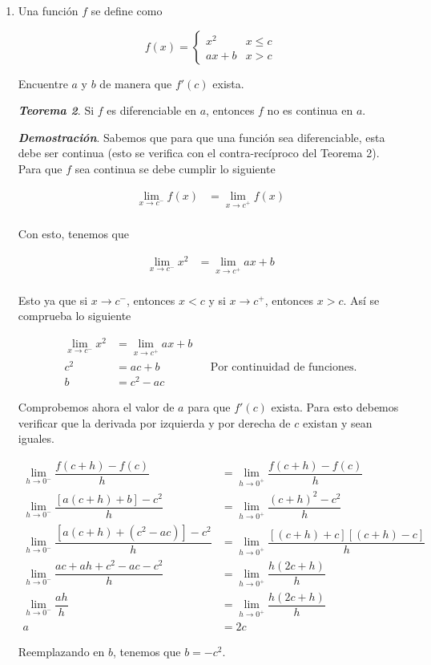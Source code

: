 \documentclass{report}
\begin{document}
\begin{enumerate}
        \item Una función $f$ se define como

        $$
            f(x) = \begin{cases}
                x^2 & x\leq c\\
                ax + b & x > c
            \end{cases}
        $$

        Encuentre $a$ y $b$ de manera que $f'(c)$ exista.

        \textit{\textbf{Teorema 2}}. Si $f$ es diferenciable en $a$, entonces $f$ no es continua en $a$.

        \textit{\textbf{Demostración}}. Sabemos que para que una función sea diferenciable, esta debe ser continua (esto se verifica con el contra-recíproco del Teorema 2). Para que $f$ sea continua se debe cumplir lo siguiente

        \begin{align*}
            \lim_{x\to c^-}f(x) &= \lim_{x\to c^+}f(x) \\
        \end{align*}

        Con esto, tenemos que

        \begin{align*}
            \lim_{x\to c^-}x^2 &= \lim_{x\to c^+}ax+b \\
        \end{align*}

        Esto ya que si $x \to c^-$, entonces $x < c$ y si $x \to c^+$, entonces $x > c$. Así se comprueba lo siguiente

        \begin{align*}
            \lim_{x\to c^-}x^2 &= \lim_{x\to c^+}ax+b \\
            c^2 &= ac+b && \text{Por continuidad de funciones.}\\
            b &= c^2 - ac
        \end{align*}

        Comprobemos ahora el valor de $a$ para que $f'(c)$ exista. Para esto debemos verificar que la derivada por izquierda y por derecha de $c$ existan y sean iguales.

        \begin{align*}
            \lim_{h \to 0^-} \dfrac{f(c+h)-f(c)}{h} &= \lim_{h \to 0^+} \dfrac{f(c+h)-f(c)}{h} \\
            \lim_{h \to 0^-} \dfrac{[a(c+h)+b]-c^2}{h} &= \lim_{h \to 0^+} \dfrac{(c+h)^2-c^2}{h} \\
            \lim_{h \to 0^-} \dfrac{[a(c+h)+(c^2-ac)]-c^2}{h} &= \lim_{h \to 0^+} \dfrac{[(c+h)+c][(c+h)-c]}{h}\\
            \lim_{h \to 0^-} \dfrac{ac+ah+c^2-ac-c^2}{h} &= \lim_{h \to 0^+} \dfrac{h(2c+h)}{h}\\
            \lim_{h \to 0^-} \dfrac{ah}{h} &= \lim_{h \to 0^+} \dfrac{h(2c+h)}{h}\\
            a &= 2c
        \end{align*}

        Reemplazando en $b$, tenemos que $b = -c^2$.
    \end{enumerate}
\end{document}
